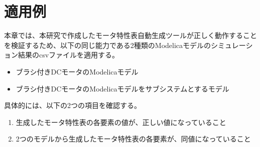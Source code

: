 \chapter{適用例}\label{cha:Indication}
本章では、本研究で作成したモータ特性表自動生成ツールが正しく動作することを検証するため、以下の同じ能力である2種類のModelicaモデルのシミュレーション結果のcsvファイルを適用する。
\begin{itemize}
    \item ブラシ付きDCモータのModelicaモデル
    \item ブラシ付きDCモータのModelicaモデルをサブシステムとするモデル
\end{itemize}
具体的には、以下の2つの項目を確認する。
\begin{enumerate}
    \item 生成したモータ特性表の各要素の値が、正しい値になっていること
    \item 2つのモデルから生成したモータ特性表の各要素が、同値になっていること
\end{enumerate}
